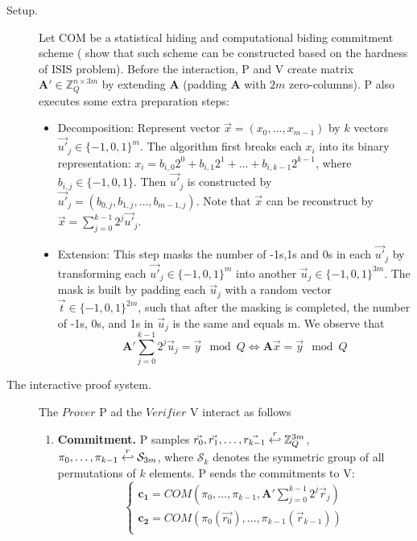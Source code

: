 \begin{description}
\item[Setup.] Let COM be a statistical hiding and computational biding
  commitment scheme (\cite{kawachi2008concurrently} show that such scheme can be
  constructed based on the hardness of ISIS problem).  Before the interaction, P
  and V create matrix $\mathbf{A'} \in \mathbb{Z}_Q^{n\times 3m}$ by extending
  $\mathbf{A}$ (padding $\mathbf{A}$ with $2m$ zero-columns). P also executes
  some extra preparation steps:
  \begin{itemize}
  \item Decomposition: Represent vector $\vec{x} = (x_0, \dots, x_{m-1})$ by $k$ vectors
    ${\vec{u'}}_j \in \{-1,0,1\}^m$. The algorithm first breaks each $x_i$ into its binary representation:
    $x_i = b_{i,0}2^0 + b_{i,1}2^1 + \dots + b_{i,k-1}2^{k-1}$, where $b_{i,j} \in \{-1, 0, 1\}$. Then ${\vec{u'}}_j$ is
    constructed by ${\vec{u'}}_j = (b_{0,j}, b_{1,j}, \dots, b_{m-1,j})$. Note that $\vec{x}$ can be reconstruct by
    $\vec{x} = \sum_{j = 0}^{k - 1}2^j{\vec{u'}}_j$.
  \item Extension: This step masks the number of -1s,1s and 0s in each ${\vec{u'}}_j$ by transforming each
    ${\vec{u'}}_j \in \{-1,0,1\}^m$ into another $\vec{u}_j \in \{-1,0,1\}^{3m}$. The mask is built by padding each
    ${\vec{u}}_j$ with a random vector $\vec{t} \in \{-1,0,1\}^{2m}$, such that after the masking is completed, the number of -1s,
    0s, and 1s in $\vec{u}_j$ is the same and equals m. We observe that
    \[
      \mathbf{A'}\sum_{j=0}^{k-1}2^j\vec{u}_j = \vec{y} \mod Q \iff \mathbf{A}\vec{x} = \vec{y} \mod Q
    \]
  \end{itemize}
\item[The interactive proof system.]  The $Prover$ P ad the $Verifier$ V interact as follows
  \begin{enumerate}
  \item \textbf{Commitment.} P samples
    $\vec{r_0}, \vec{r_1}, \dots, \vec{r_{k-1}} \stackrel{r}{\hookleftarrow}
    \mathbb{Z}_Q^{3m}$,
    $\pi_{0}, \dots, \pi_{k-1} \stackrel{r}{\hookleftarrow} \mathcal{S}_{3m}$, where
    $\mathcal{S}_{k}$ denotes the symmetric group of all permutations of $k$
    elements. P sends the commitments to V:
    \[
      \begin{cases}
        \mathbf{c_1} = COM(\pi_0,\dots,\pi_{k-1},
        \mathbf{A'}\sum_{j=0}^{k-1}2^j\vec{r}_j) \\
        \mathbf{c_2} = COM(\pi_0(\vec{r_0}), \dots,
        \pi_{k-1}(\vec{r}_{k-1}))\\

\end{cases}\]
\end{enumerate}
\end{description}
